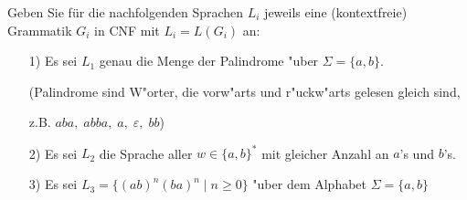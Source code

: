 
\begin{exercise}
Geben Sie für die nachfolgenden Sprachen $L_i$ jeweils
eine (kontextfreie) Grammatik $G_i$ in CNF mit $L_i=L(G_i)$ an:

\begin{enumerate}
\item [1)]
Es sei $L_1$ genau die Menge der Palindrome "uber $\Sigma = \{ a, b \} $.

(Palindrome sind W"orter, die vorw"arts und r"uckw"arts gelesen
  gleich sind,
  
  z.B. $ aba, \; abba, \; a, \; \varepsilon , \; bb$)
  
\item [2)]
Es sei $L_2$ die Sprache aller $w \in \{ a, b \}^{ * } $ mit
  gleicher Anzahl an $a$'s und $b$'s.
  
\item [3)]
Es sei $L_3 = \{ (ab)^{n}  (ba)^{n} \mid n \geq 0 \}$
  "uber dem Alphabet $ \Sigma = \{ a, b \} $

\end{enumerate}
	
\end{exercise}

